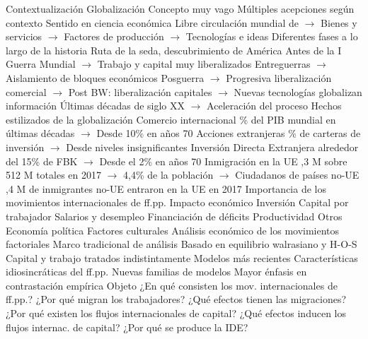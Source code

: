 \documentclass{nuevotema}
\begin{document}
\begin{esquema}[enumerate]
\end{esquema}

\esquemalargo

\begin{esquemal}
	\1[] 
		\2 Contextualización
			\3 Globalización
				\4 Concepto muy vago
				\4[] Múltiples acepciones según contexto
				\4 Sentido en ciencia económica
				\4[] Libre circulación mundial de
				\4[] $\to$ Bienes y servicios
				\4[] $\to$ Factores de producción
				\4[] $\to$ Tecnologías e ideas
				\4 Diferentes fases a lo largo de la historia
				\4[] Ruta de la seda, descubrimiento de América
				\4[] Antes de la I Guerra Mundial
				\4[] $\to$ Trabajo y capital muy liberalizados
				\4[] Entreguerras
				\4[] $\to$ Aislamiento de bloques económicos
				\4[] Posguerra
				\4[] $\to$ Progresiva liberalización comercial
				\4[] $\to$ Post BW: liberalización capitales
				\4[] $\to$ Nuevas tecnologías globalizan información
				\4 Últimas décadas de siglo XX
				\4[] $\to$ Aceleración del proceso
				\4 Hechos estilizados de la globalización
				\4[] Comercio internacional
				\% del PIB mundial en últimas décadas
				\4[] $\to$ Desde 10\% en años 70
				\4 Acciones extranjeras
				\% de carteras de inversión
				\4[] $\to$ Desde niveles insignificantes
				\4 Inversión Directa Extranjera
				\4[] alrededor del 15\% de FBK
				\4[] $\to$ Desde el 2\% en años 70
				\4 Inmigración en la UE
				,3 M sobre 512 M totales en 2017
				\4[] $\to$ 4,4\% de la población
				\4[] $\to$ Ciudadanos de países no-UE
				,4 M de inmigrantes no-UE entraron en la UE en 2017
			\3 Importancia de los movimientos internacionales de ff.pp.
				\4 Impacto económico
				\4[] Inversión
				\4[] Capital por trabajador
				\4[] Salarios y desempleo
				\4[] Financiación de déficits
				\4[] Productividad
				\4 Otros
				\4[] Economía política
				\4[] Factores culturales
			\3 Análisis económico de los movimientos factoriales
				\4 Marco tradicional de análisis
				\4[] Basado en equilibrio walrasiano y H-O-S
				\4[] Capital y trabajo tratados indistintamente
				\4 Modelos más recientes
				\4[] Características idiosincráticas del ff.pp.
				\4[] Nuevas familias de modelos
				\4[] Mayor énfasis en contrastación empírica
		\2 Objeto
			\3 ¿En qué consisten los mov. internacionales de ff.pp.?
			\3 ¿Por qué migran los trabajadores?
			\3 ¿Qué efectos tienen las migraciones?
			\3 ¿Por qué existen los flujos internacionales de capital?
			\3 ¿Qué efectos inducen los flujos internac. de capital?
			\3 ¿Por qué se produce la IDE?

\end{esquemal}
\end{document}
